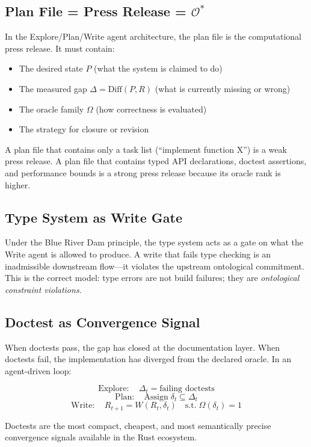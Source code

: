 \documentclass[11pt,a4paper]{article}
\theoremstyle{definition}
\begin{document}
\subsection{Plan File = Press Release = $\mathcal{O}^*$}

In the Explore/Plan/Write agent architecture, the plan file is the computational press release. It must contain:
\begin{itemize}
\item The desired state $P$ (what the system is claimed to do)
\item The measured gap $\Delta = \text{Diff}(P, R)$ (what is currently missing or wrong)
\item The oracle family $\Omega$ (how correctness is evaluated)
\item The strategy for closure or revision
\end{itemize}

A plan file that contains only a task list (``implement function X'') is a weak press release. A plan file that contains typed API declarations, doctest assertions, and performance bounds is a strong press release because its oracle rank is higher.

\subsection{Type System as Write Gate}

Under the Blue River Dam principle, the type system acts as a gate on what the Write agent is allowed to produce. A write that fails type checking is an inadmissible downstream flow---it violates the upstream ontological commitment. This is the correct model: type errors are not build failures; they are \emph{ontological constraint violations}.

\subsection{Doctest as Convergence Signal}

When doctests pass, the gap has closed at the documentation layer. When doctests fail, the implementation has diverged from the declared oracle. In an agent-driven loop:

$$\text{Explore}: \quad \Delta_t = \text{failing doctests}$$
$$\text{Plan}: \quad \text{Assign}\;\delta_t \subseteq \Delta_t$$
$$\text{Write}: \quad R_{t+1} = W(R_t, \delta_t) \quad \text{s.t.}\; \Omega(\delta_t) = 1$$

Doctests are the most compact, cheapest, and most semantically precise convergence signals available in the Rust ecosystem.
\end{document}
